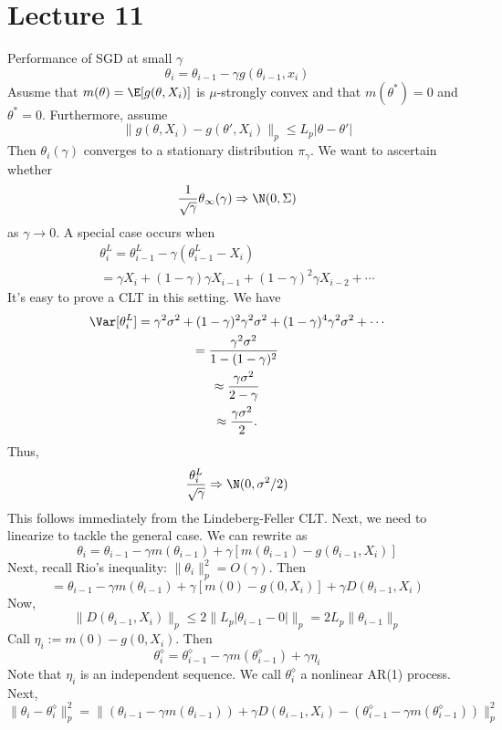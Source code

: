 \section{Lecture 11}

Performance of SGD at small \(\gamma\)
\[\theta_i = \theta_{i-1} - \gamma g(\theta_{i-1}, x_i)\]
Asusme that \(m(\theta) = \E[g(\theta, X_i)]\) is \(\mu\)-strongly convex and that \(m(\theta^*) = 0\) and \(\theta^*= 0\). Furthermore, assume
\[\|g(\theta, X_i) - g(\theta', X_i)\|_p \leq L_p |\theta - \theta'|\]
Then \(\theta_i(\gamma)\) converges to a stationary distribution \(\pi_\gamma\). We want to ascertain whether
\[\frac{1}{\sqrt \gamma}\theta_\infty(\gamma) \Rightarrow \N(0, \Sigma)\]
as \(\gamma \to 0\). A special case occurs when
\[\begin{gathered}\theta_i^L = \theta_{i-1}^L - \gamma (\theta_{i-1}^L - X_i) \\
= \gamma X_i + (1 - \gamma)\gamma X_{i-1} + (1 - \gamma)^2 \gamma X_{i-2} + \cdots\end{gathered}\]
It's easy to prove a CLT in this setting. We have
\[\begin{gathered}\Var[\theta_i^L] = \gamma^2 \sigma^2 + (1 - \gamma)^2 \gamma^2 \sigma^2 + (1 - \gamma)^4 \gamma^2 \sigma^2 + \cdots \\
= \frac{\gamma^2 \sigma^2}{1 - (1 - \gamma)^2} \\
\approx \frac{\gamma \sigma^2}{2 - \gamma} \\
\approx \frac{\gamma \sigma^2}{2}.\end{gathered}\]
Thus,
\[\frac{\theta_i^L}{\sqrt \gamma} \Rightarrow \N(0, \sigma^2/2)\]
This follows immediately from the Lindeberg-Feller CLT. Next, we need to linearize to tackle the general case. We can rewrite as
\[\theta_i = \theta_{i-1} - \gamma m(\theta_{i-1}) + \gamma [m(\theta_{i-1}) - g(\theta_{i-1}, X_i)]\]
Next, recall Rio's inequality: \(\|\theta_i\|_p^2 = O(\gamma)\). Then
\[= \theta_{i-1} - \gamma m(\theta_{i-1}) + \gamma[m(0) - g(0, X_i)] + \gamma D(\theta_{i-1}, X_i)\]
Now,
\[\|D(\theta_{i-1}, X_i)\|_p \leq 2\| L_p |\theta_{i-1} - 0|\|_p = 2L_p\|\theta_{i-1}\|_p\]
Call \(\eta_i := m(0) - g(0, X_i)\). Then
\[\theta_i^\diamond = \theta_{i-1}^\diamond - \gamma m(\theta_{i-1}^\diamond) + \gamma \eta_i\]
Note that \(\eta_i\) is an independent sequence. We call \(\theta_i^\diamond\) a nonlinear AR(1) process. Next,
\[\|\theta_i - \theta_i^\diamond\|_p^2 = \|(\theta_{i-1} - \gamma m(\theta_{i-1})) + \gamma D(\theta_{i-1}, X_i) - (\theta_{i-1}^\diamond - \gamma m(\theta_{i-1}^\diamond))\|_p^2\]
